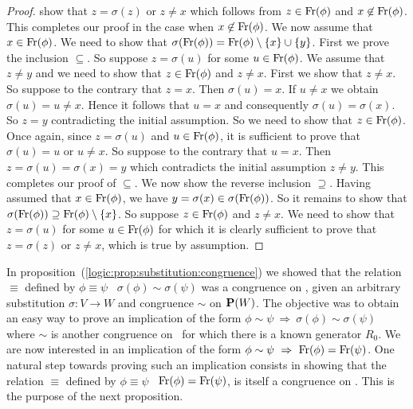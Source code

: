 \begin{proof}
show that $z=\sigma(z)$ or $z\neq x$ which follows from
$z\in\mbox{\rm Fr}(\phi)$ and $x\not\in\mbox{\rm Fr}(\phi)$. This completes our
proof in the case when $x\not\in\mbox{\rm Fr}(\phi)$. We now assume that
$x\in\mbox{\rm Fr}(\phi)$. We need to show that
$\sigma(\mbox{\rm Fr}(\phi))=\mbox{\rm Fr}(\phi)\setminus\{x\}\cup\{y\}$. First we
prove the inclusion $\subseteq$. So suppose $z=\sigma(u)$ for some
$u\in\mbox{\rm Fr}(\phi)$. We assume that $z\neq y$ and we need to show that
$z\in\mbox{\rm Fr}(\phi)$ and $z\neq x$. First we show that $z\neq x$. So
suppose to the contrary that $z=x$. Then $\sigma(u)=x$. If $u\neq x$
we obtain $\sigma(u)=u\neq x$. Hence it follows that $u=x$ and
consequently $\sigma(u)=\sigma(x)$. So $z=y$ contradicting the
initial assumption. So we need to show that $z\in\mbox{\rm Fr}(\phi)$. Once
again, since $z=\sigma(u)$ and $u\in\mbox{\rm Fr}(\phi)$, it is sufficient
to prove that $\sigma(u)=u$ or $u\neq x$. So suppose to the contrary
that $u=x$. Then $z=\sigma(u)=\sigma(x)=y$ which contradicts the
initial assumption $z\neq y$. This completes our proof of
$\subseteq$. We now show the reverse inclusion $\supseteq$. Having
assumed that $x\in\mbox{\rm Fr}(\phi)$, we have
$y=\sigma(x)\in\sigma(\mbox{\rm Fr}(\phi))$. So it remains to show that
$\sigma(\mbox{\rm Fr}(\phi))\supseteq\mbox{\rm Fr}(\phi)\setminus\{x\}$. So suppose
$z\in\mbox{\rm Fr}(\phi)$ and $z\neq x$. We need to show that $z=\sigma(u)$
for some $u\in\mbox{\rm Fr}(\phi)$ for which it is clearly sufficient to
prove that $z=\sigma(z)$ or $z\neq x$, which is true by assumption.
\end{proof}

In proposition~(\ref{logic:prop:substitution:congruence}) we showed
that the relation $\equiv$ defined by $\phi\equiv\psi$ \ifand\
$\sigma(\phi)\sim\sigma(\psi)$ was a congruence on \pv, given an
arbitrary substitution $\sigma:V\to W$ and congruence $\sim$ on
${\bf P}(W)$. The objective was to obtain an easy way to prove an
implication of the form $\phi\sim\psi\ \Rightarrow\
\sigma(\phi)\sim\sigma(\psi)$ where $\sim$ is another congruence on
\pv\ for which there is a known generator $R_{0}$. We are now
interested in an implication of the form $\phi\sim\psi\ \Rightarrow\
\mbox{\rm Fr}(\phi)=\mbox{\rm Fr}(\psi)$. One natural step towards proving such an
implication consists in showing that the relation $\equiv$ defined
by $\phi\equiv\psi$ \ifand\ $\mbox{\rm Fr}(\phi)=\mbox{\rm Fr}(\psi)$, is itself a
congruence on \pv. This is the purpose of the next proposition.


